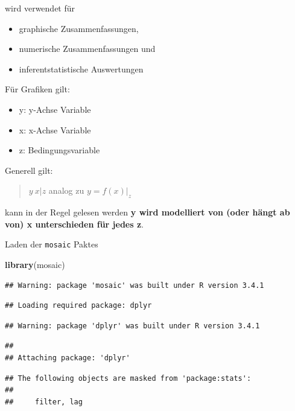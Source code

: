 \documentclass[10pt,ngerman,onside]{article}
\newenvironment{Shaded}{\begin{snugshade}}{\end{snugshade}}
\newcommand{\KeywordTok}[1]{\textcolor[rgb]{0.13,0.29,0.53}{\textbf{#1}}}
\newcommand{\NormalTok}[1]{#1}
\providecommand{\tightlist}{%
  \setlength{\itemsep}{0pt}\setlength{\parskip}{0pt}}
\begin{document}
wird verwendet für

\begin{itemize}
\tightlist
\item
  graphische Zusammenfassungen,
\item
  numerische Zusammenfassungen und
\item
  inferentstatistische Auswertungen
\end{itemize}

Für Grafiken gilt:

\begin{itemize}
\tightlist
\item
  y: y-Achse Variable
\item
  x: x-Achse Variable
\item
  z: Bedingungsvariable
\end{itemize}

Generell gilt:

\begin{quote}
\(y ~ x | z\) analog zu \(y = f(x)|_z\)
\end{quote}

kann in der Regel gelesen werden \textbf{y wird modelliert von (oder
hängt ab von) x unterschieden für jedes z}.

Laden der \texttt{mosaic} Paktes

\begin{Shaded}
\begin{Highlighting}[]
\KeywordTok{library}\NormalTok{(mosaic)}
\end{Highlighting}
\end{Shaded}

\begin{verbatim}
## Warning: package 'mosaic' was built under R version 3.4.1
\end{verbatim}

\begin{verbatim}
## Loading required package: dplyr
\end{verbatim}

\begin{verbatim}
## Warning: package 'dplyr' was built under R version 3.4.1
\end{verbatim}

\begin{verbatim}
## 
## Attaching package: 'dplyr'
\end{verbatim}

\begin{verbatim}
## The following objects are masked from 'package:stats':
## 
##     filter, lag
\end{verbatim}
\end{document}
